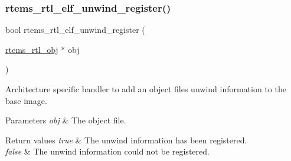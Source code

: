 \subsubsection{\texorpdfstring{rtems\_rtl\_elf\_unwind\_register()}{rtems\_rtl\_elf\_unwind\_register()}}
{\footnotesize\ttfamily bool rtems\+\_\+rtl\+\_\+elf\+\_\+unwind\+\_\+register (\begin{DoxyParamCaption}\item[{\mbox{\hyperlink{structrtems__rtl__obj}{rtems\+\_\+rtl\+\_\+obj}} $\ast$}]{obj }\end{DoxyParamCaption})}

Architecture specific handler to add an object file\textquotesingle{}s unwind information to the base image.


\begin{DoxyParams}{Parameters}
{\em obj} & The object file. \\
\hline
\end{DoxyParams}

\begin{DoxyRetVals}{Return values}
{\em true} & The unwind information has been registered. \\
\hline
{\em false} & The unwind information could not be registered. \\
\hline
\end{DoxyRetVals}
